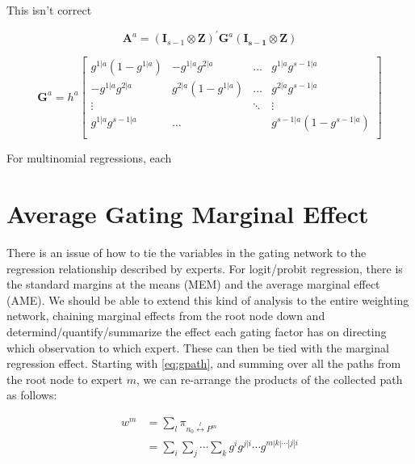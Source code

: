 \documentclass[12pt]{article}
\begin{document}
\bigskip

This isn't correct

\begin{equation} \label{eq:gatinghessianQ}
  \mathbf{A}^{a} = (\mathbf{I}_{s-1} \otimes \mathbf{Z})^{\prime} \mathbf{G}^{a} (\mathbf{I_{s-1}} \otimes \mathbf{Z})
\end{equation}

\begin{equation} \label{eq:nodehessian}
  \mathbf{G}^{a} = h^{a} \begin{bmatrix}
     g^{1|a}(1-g^{1|a}) & -g^{1|a}g^{2|a}    & \dots  & g^{1|a}g^{s-1|a}       \\
     -g^{1|a}g^{2|a}    & g^{2|a}(1-g^{1|a}) & \dots  & g^{2|a}g^{s-1|a}       \\
     \vdots             &                    & \ddots & \vdots                 \\
     g^{1|a}g^{s-1|a}   &  \dots             &        & g^{s-1|a}(1-g^{s-1|a}) \\
  \end{bmatrix}
\end{equation}

For multinomial regressions, each 



\section{Average Gating Marginal Effect}
There is an issue of how to tie the variables in the gating network to the regression relationship described by experts. For logit/probit regression, there is the standard margins at the means (MEM) and the average marginal effect (AME). We should be able to extend this kind of analysis to the entire weighting network, chaining marginal effects from the root node down and determind/quantify/summarize the effect each gating factor has on directing which observation to which expert. These can then be tied with the marginal regression effect. Starting with \ref{eq:gpath}, and summing over all the paths from the root node to expert $m$, we can re-arrange the products of the collected path as follows:  

\begin{equation}
  \begin{split}
  w^{m} &= \sum_{l} \pi_{n_{0} \overset{l}{\longleftrightarrow} P^{m}} \\
        &= \sum_{i} \sum_{j} \cdots \sum_{k} g^{i} g^{j|i} \cdots g^{m|k|\cdots|j|i} \\
  \end{split}
\end{equation}
\end{document}
